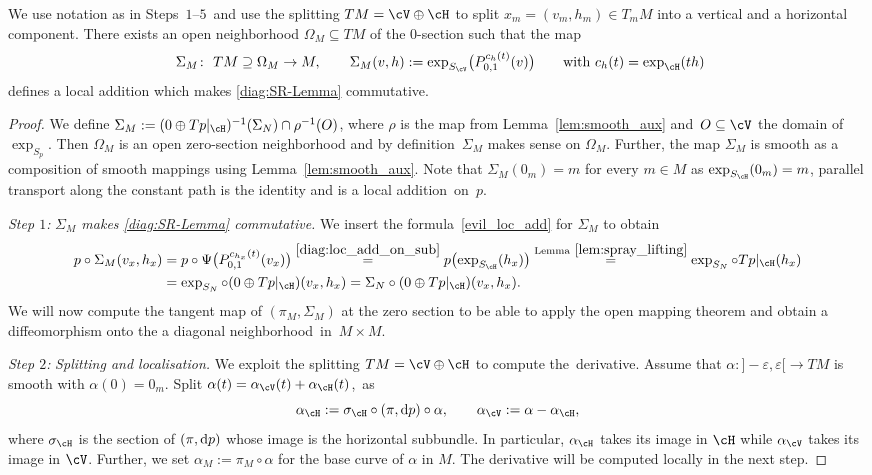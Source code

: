 \begin{Proposition}\label{prop:custom_sigma}
We use notation as in %
Steps~$1$--$5$~and use the splitting $TM=\cV \oplus \cH$ to split $x_m=(v_m,h_m) \in T_m M$ into a vertical and a horizontal component.
There exists an open neighborhood $\Omega_M \subseteq TM$ of the $0$-section such that the map
\begin{align}\label{evil_loc_add}
\Sigma_M\colon \ TM\supseteq \Omega_M \rightarrow M,\qquad \Sigma_{M} (v,h) := \exp_{S_{\cV}}\bigl(P_{0,1}^{c_h(t)}(v)\bigr) \qquad \text{with } c_h(t)=\exp_{\cH}(th)\!\!
\end{align}
defines a local addition which makes \eqref{diag:SR-Lemma} commutative.
\end{Proposition}

\begin{proof}
We define $\Sigma_M := (0 \oplus Tp|_{\cH})^{-1}(\Sigma_N) \cap \rho^{-1} (O)$, where $\rho$ is the map from Lemma~\ref{lem:smooth_aux} and~${O \subseteq \cV}$ the domain of $\exp_{S_p}$. Then $\Omega_M$ is an open zero-section neighborhood and by definition~$\Sigma_M$ makes sense on $\Omega_M$. Further, the map $\Sigma_M$ is smooth as a composition of smooth mappings using Lemma~\ref{lem:smooth_aux}. Note that $\Sigma_M (0_m) = m$ for every $m \in M$ as $\exp_{S_\cH} (0_m)=m$, parallel transport along the constant path is the identity and  is a local addition~on~$p$.

{\it Step $1$:} \emph{$\Sigma_M$ makes \eqref{diag:SR-Lemma} commutative.} We insert the formula~\eqref{evil_loc_add} for $\Sigma_M$ to obtain
\begin{align*}
p\circ \Sigma_M (v_x,h_x)&= p\circ \Psi \bigl(P_{0,1}^{c_{h_x}(t)}(v_x)\bigr) \stackrel{\eqref{diag:loc_add_on_sub}}{=} p \bigl(\exp_{S_\cH} (h_x)\bigr)\stackrel{\text{Lemma}~\ref{lem:spray_lifting}}{=} \exp_{S_N} \circ Tp|_\cH (h_x)\\
& = \exp_{S_N} \circ (0\oplus Tp|_\cH)(v_x,h_x) = \Sigma_N\circ (0\oplus Tp|_\cH)(v_x,h_x).
\end{align*}
We will now compute the tangent map of $(\pi_M,\Sigma_M)$ at the zero section to be able to apply the open mapping theorem and obtain a diffeomorphism onto the a diagonal neighborhood~in~${M\times M}$.

{\it Step $2$:} \emph{Splitting and localisation.}
We exploit the splitting $TM = \cV \oplus \cH$ to compute the~derivative. Assume that $\alpha \colon {}]{-}\varepsilon,\varepsilon[ \rightarrow TM$ is smooth with $\alpha(0)=0_m$. Split $\alpha(t)=\alpha_\cV(t) + \alpha_\cH(t)$,~as
\begin{displaymath}
 \alpha_\cH := \sigma_\cH \circ (\pi,{\rm d}p) \circ \alpha, \qquad \alpha_\cV := \alpha - \alpha_\cH,
\end{displaymath}
where $\sigma_\cH$ is the section of $(\pi,{\rm d}p)$ whose image is the horizontal subbundle. In particular, $\alpha_\cH$ takes its image in $\cH$ while $\alpha_\cV$ takes its image in $\cV$. Further, we set $\alpha_M := \pi_{M} \circ \alpha$ for the base curve of $\alpha$ in $M$. The derivative will be computed locally in the next step.


\end{proof}
